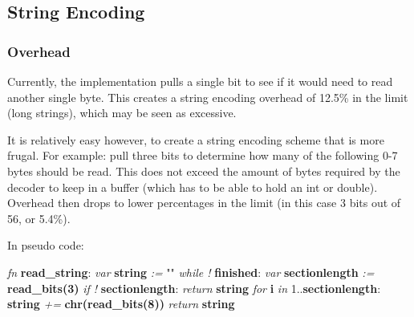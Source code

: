 \subsection{String Encoding}

\subsubsection{Overhead}

Currently, the implementation pulls a single bit to see if it would need
to read another single byte. This creates a string encoding overhead of
12.5\% in the limit (long strings), which may be seen as excessive.

It is relatively easy however, to create a string encoding scheme that
is more frugal. For example: pull three bits to determine how many of the
following 0-7 bytes should be read. This does not exceed the amount of
bytes required by the decoder to keep in a buffer (which has to be
able to hold an int or double).
Overhead then drops to lower percentages in the limit
(in this case 3 bits out of 56, or 5.4\%).

In pseudo code:

\begin{changemargin}{-60mm}{0mm}
\begin{myquote}

\vbox{
\textit{fn} \textbf{read\_string}: \newline
\indent\hspace{.5cm} \textit{var} \textbf{string} \textit{:=} "" \newline
\indent\hspace{.5cm} \textit{while !} \textbf{finished}: \newline
\indent\hspace{1cm} \textit{var} \textbf{sectionlength} \textit{:=} \textbf{read\_bits(3)} \newline
\indent\hspace{1cm} \textit{if !} \textbf{sectionlength}: \newline
\indent\hspace{1.5cm} \textit{return} \textbf{string} \newline
\indent\hspace{1cm} \textit{for} \textbf{i} \textit{in} 1..\textbf{sectionlength}: \newline
\indent\hspace{1.5cm} \textbf{string} \textit{+=} \textbf{chr(read\_bits(8))} \newline
\indent\hspace{.5cm} \textit{return} \textbf{string} \newline
}

\end{myquote}
\end{changemargin}

